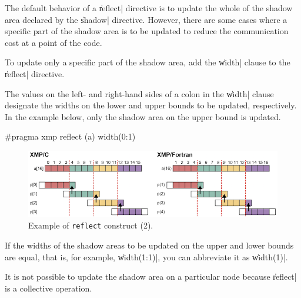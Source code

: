 The default behavior of a \|reflect| directive is to update the whole of
the shadow area declared by the \|shadow| directive. However, there are
some cases where a specific part of the shadow area is to be updated to
reduce the communication cost at a point of the code.

To update only a specific part of the shadow area, add the \|width|
clause to the \|reflect| directive.

The values on the left- and right-hand sides of a colon in the \|width|
clause designate the widths on the lower and upper bounds to be updated,
respectively. In the example below, only the shadow area on the upper
bound is updated.

\begin{XCexample}
#pragma xmp reflect (a) width(0:1)
\end{XCexample}


\begin{figure}
  \centering
  \includegraphics[width=\textwidth]{figs/reflect_width.png}
  \caption{Example of {\tt reflect} construct (2).}
\end{figure}

\begin{mynote}
  If the widths of the shadow areas to be updated on the upper and lower 
  bounds are equal, that is, for example, \|width(1:1)|, you can
  abbreviate it as \|width(1)|.
\end{mynote}

\begin{mynote}
  It is not possible to update the shadow area on a particular node
  because \|reflect| is a collective operation.
\end{mynote}


